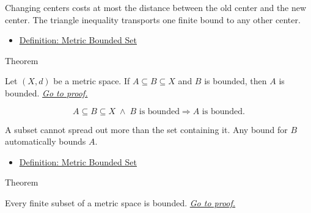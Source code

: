 \begin{remark*}[Interpretation]
Changing centers costs at most the distance between the old center and the
new center.  The triangle inequality transports one finite bound to any other
center.
\end{remark*}

\begin{dependencies}
\begin{itemize}
  \item \hyperref[def:metric-bounded-set]{Definition: Metric Bounded Set}
\end{itemize}
\end{dependencies}

\begin{theorembox}{Theorem}
\begin{theorem}
\label{thm:metric-subsets-bounded-sets-bounded}
Let \((X,d)\) be a metric space.  If \(A\subseteq B\subseteq X\) and \(B\) is
bounded, then \(A\) is bounded.
\hyperref[prf:metric-subsets-bounded-sets-bounded]{\textit{Go to proof.}}
\end{theorem}
\end{theorembox}

\begin{remark*}
\[
A\subseteq B\subseteq X
\;\land\;
B\text{ is bounded}
\Longrightarrow
A\text{ is bounded}.
\]
\end{remark*}

\begin{remark*}[Interpretation]
A subset cannot spread out more than the set containing it.  Any bound for
\(B\) automatically bounds \(A\).
\end{remark*}

\begin{dependencies}
\begin{itemize}
  \item \hyperref[def:metric-bounded-set]{Definition: Metric Bounded Set}
\end{itemize}
\end{dependencies}

\begin{theorembox}{Theorem}
\begin{theorem}\label{thm:metric-finite-sets-bounded}
Every finite subset of a metric space is bounded.
\hyperref[prf:metric-finite-sets-bounded]{\textit{Go to proof.}}
\end{theorem}
\end{theorembox}

